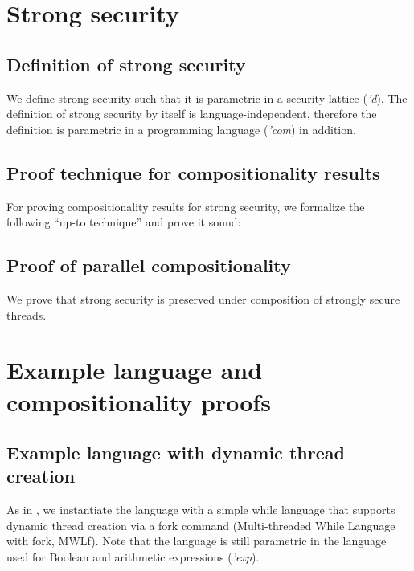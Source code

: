 \documentclass[11pt,a4paper]{article}
\begin{document}


\section{Strong security}

\subsection{Definition of strong security}

We define strong security such that it is parametric in a security
lattice (\textit{'d}). The definition of strong security by itself is
language-independent, therefore the definition is parametric in a
programming language (\textit{'com}) in addition.




\subsection{Proof technique for compositionality results}

For proving compositionality results for strong security, we formalize
the following ``up-to technique'' and prove it sound:




\subsection{Proof of parallel compositionality}

We prove that strong security is preserved under composition of
strongly secure threads.




\section{Example language and compositionality proofs}

\subsection{Example language with dynamic thread creation}

As in \cite{sabelfeld2000probabilistic}, we instantiate the language
with a simple while language that supports dynamic thread creation via
a fork command (Multi-threaded While Language with fork, MWLf). Note
that the language is still parametric in the language used for Boolean
and arithmetic expressions (\textit{'exp}).
\end{document}
